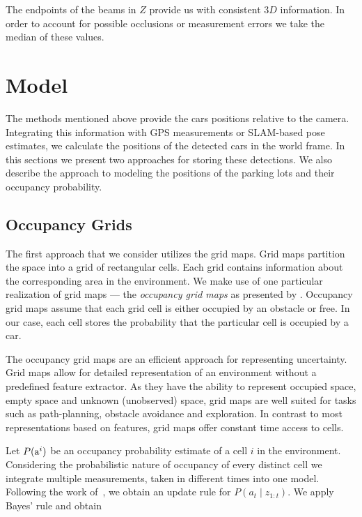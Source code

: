 The endpoints of the beams in $Z$ provide us with consistent $3D$ information.
In order to account for possible occlusions or measurement errors we take the
median of these values.


\section{Model} %
\label{sec:model}

The methods mentioned above provide the cars positions relative to the camera.
Integrating this information with GPS measurements or SLAM-based pose
estimates, we calculate the positions of the detected cars in the world frame.
In this sections we present two approaches for storing these detections. We
also describe the approach to modeling the positions of the parking lots and
their occupancy probability.

\subsection{Occupancy Grids}
\label{sub:occupancy_grids}

The first approach that we consider utilizes the grid maps. Grid maps
partition the space into a grid of rectangular cells. Each grid contains
information about the corresponding area in the environment. We make use of
one particular realization of grid maps --- the \emph{occupancy grid maps} as
presented by \citet{occupancy_grids}. Occupancy grid maps assume that each
grid cell is either occupied by an obstacle or free. In our case, each cell
stores the probability that the particular cell is occupied by a car.

The occupancy grid maps are an efficient approach for representing
uncertainty. Grid maps allow for detailed representation of an environment
without a predefined feature extractor. As they have the ability to represent
occupied space, empty space and unknown (unobserved) space, grid maps are well
suited for tasks such as path-planning, obstacle avoidance and exploration. In
contrast to most representations based on features, grid maps offer constant
time access to cells.

Let $P({\mbox{a}^i})$ be an occupancy probability estimate of a cell $i$ in the
environment. Considering the probabilistic nature of occupancy of every
distinct cell we integrate multiple measurements, taken in different times
into one model. Following the work of~\citet{occupancy_grids}, we obtain an
update rule for $P(a_t\mid z_{1:t})$. We apply Bayes' rule and obtain

